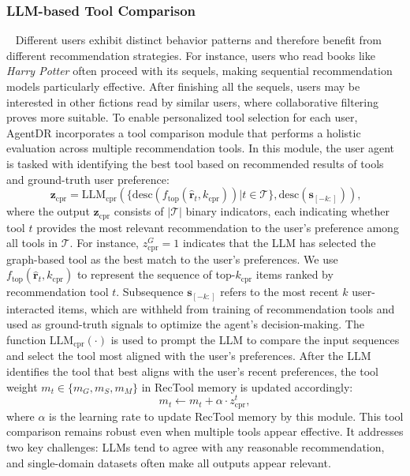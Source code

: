\subsubsection{LLM-based Tool Comparison}~\label{sec:tool_compare}
Different users exhibit distinct behavior patterns and therefore benefit from different recommendation strategies. For instance, users who read books like \textit{Harry Potter} often proceed with its sequels, making sequential recommendation models particularly effective. After finishing all the sequels, users may be interested in other fictions read by similar users, where collaborative filtering proves more suitable. To enable personalized tool selection for each user, AgentDR incorporates a tool comparison module that performs a holistic evaluation across multiple recommendation tools. In this module, the user agent is tasked with identifying the best tool based on recommended results of tools and ground-truth user preference:
\begin{equation}~\label{eq_agentdr:tool_cmpr}
    \mathbf{z}_{\text{cpr}} = \text{LLM}_{\text{cpr}}(\{\text{desc}(f_\text{top}(\hat{\mathbf{r}}_{t}, k_{\text{cpr}}))|t\in \mathcal{T}\}, \text{desc}(\mathbf{s}_{[-k:]})),
\end{equation}
where the output $\mathbf{z}_{\text{cpr}}$ consists of $|\mathcal{T}|$ binary indicators, each indicating whether tool $t$ provides the most relevant recommendation to the user's preference among all tools in $\mathcal{T}$. For instance, $z_{\text{cpr}}^{G} = 1$ indicates that the LLM has selected the graph-based tool as the best match to the user’s preferences.
We use $f_\text{top}(\hat{\mathbf{r}}_{t}, k_{\text{cpr}})$ to represent the sequence of top-$k_{\text{cpr}}$ items ranked by recommendation tool $t$. Subsequence $\mathbf{s}_{[-k:]}$ refers to the most recent $k$ user-interacted items, which are withheld from training of recommendation tools and used as ground-truth signals to optimize the agent's decision-making. The function $\text{LLM}_\text{cpr}(\cdot)$ is used to prompt the LLM to compare the input sequences and select the tool most aligned with the user's preferences.
After the LLM identifies the tool that best aligns with the user’s recent preferences, the tool weight $m_{t}\in \{m_G, m_S, m_M\}$ in RecTool memory is updated accordingly:
\begin{equation}\label{eq_agentdr:toolcpr}
    m_{t} \leftarrow  m_{t} + \alpha\cdot z_{\text{cpr}}^{t}, 
\end{equation}
where $\alpha$ is the learning rate to update RecTool memory by this module. 
This tool comparison remains robust even when multiple tools appear effective. It addresses two key challenges: LLMs tend to agree with any reasonable recommendation, and single-domain datasets often make all outputs appear relevant.

